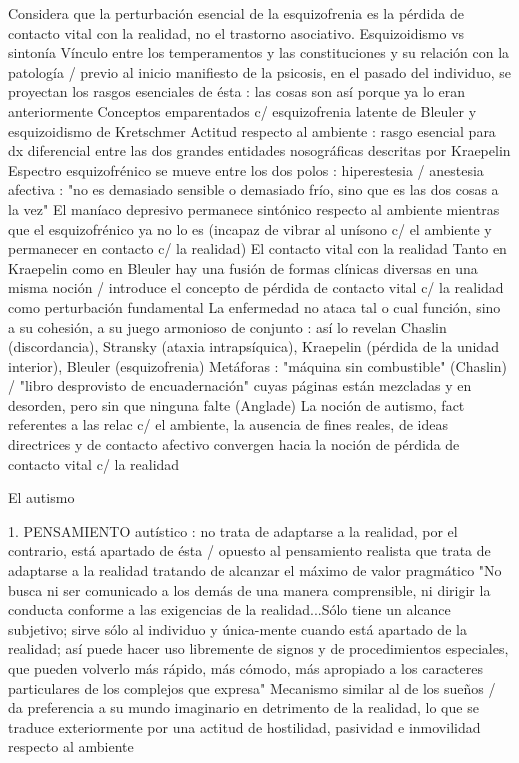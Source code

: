Considera que la perturbación esencial de la esquizofrenia es la pérdida de contacto vital con la realidad, no el trastorno asociativo. Esquizoidismo vs sintonía Vínculo entre los temperamentos y las constituciones y su relación con la patología / previo al inicio manifiesto de la psicosis, en el pasado del individuo, se proyectan los rasgos esenciales de ésta : las cosas son así porque ya lo eran anteriormente Conceptos emparentados c/ esquizofrenia latente de Bleuler y esquizoidismo de Kretschmer Actitud respecto al ambiente : rasgo esencial para dx diferencial entre las dos grandes entidades nosográficas descritas por Kraepelin Espectro esquizofrénico se mueve entre los dos polos : hiperestesia / anestesia afectiva : "no es demasiado sensible o demasiado frío, sino que es las dos cosas a la vez" El maníaco depresivo permanece sintónico respecto al ambiente mientras que el esquizofrénico ya no lo es (incapaz de vibrar al unísono c/ el ambiente y permanecer en contacto c/ la realidad) El contacto vital con la realidad Tanto en Kraepelin como en Bleuler hay una fusión de formas clínicas diversas en una misma noción / introduce el concepto de pérdida de contacto vital c/ la realidad como perturbación fundamental La enfermedad no ataca tal o cual función, sino a su cohesión, a su juego armonioso de conjunto : así lo revelan Chaslin (discordancia), Stransky (ataxia intrapsíquica), Kraepelin (pérdida de la unidad interior), Bleuler (esquizofrenia) Metáforas : "máquina sin combustible" (Chaslin) / "libro desprovisto de encuadernación" cuyas páginas están mezcladas y en desorden, pero sin que ninguna falte (Anglade) La noción de autismo, fact referentes a las relac c/ el ambiente, la ausencia de fines reales, de ideas directrices y de contacto afectivo convergen hacia la noción de pérdida de contacto vital c/ la realidad

El autismo

1. PENSAMIENTO autístico : no trata de adaptarse a la realidad, por el contrario, está apartado de ésta / opuesto al pensamiento realista que trata de adaptarse a la realidad tratando de alcanzar el máximo de valor pragmático "No busca ni ser comunicado a los demás de una manera comprensible, ni dirigir la conducta conforme a las exigencias de la realidad...Sólo tiene un alcance subjetivo; sirve sólo al individuo y única-mente cuando está apartado de la realidad; así puede hacer uso libremente de signos y de procedimientos especiales, que pueden volverlo más rápido, más cómodo, más apropiado a los caracteres particulares de los complejos que expresa" Mecanismo similar al de los sueños / da preferencia a su mundo imaginario en detrimento de la realidad, lo que se traduce exteriormente por una actitud de hostilidad, pasividad e inmovilidad respecto al ambiente

